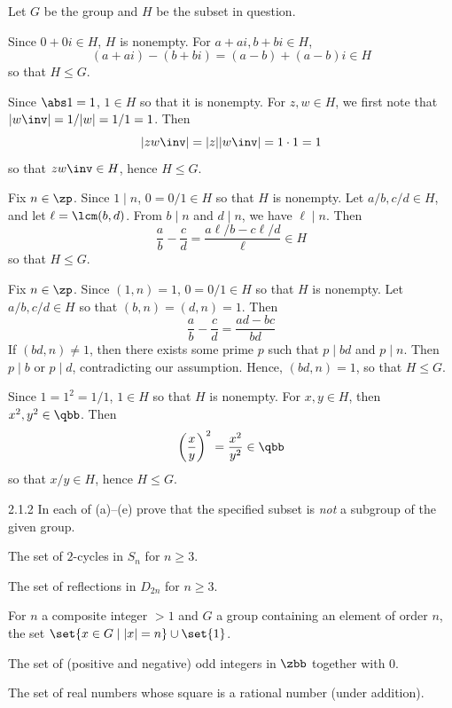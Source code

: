 \begin{sol}
    Let $G$ be the group and $H$ be the subset in question.
    \begin{subexercises}
        \item Since $0 + 0i \in H$, $H$ is nonempty.
        For $a + ai, b + bi \in H$,
        \[
        	(a + ai) - (b + bi) = (a - b) + (a - b)i \in H
        \]
        so that $H \leq G$.
        \item Since $\abs 1 = 1$, $1 \in H$ so that it is nonempty.
        For $z, w \in H$, we first note that $|w\inv| = 1/|w| = 1/1 = 1$.
        Then
        \[
        	|zw\inv| = |z||w\inv| = 1 \cdot 1 = 1
        \]
        so that $zw\inv \in H$, hence $H \leq G$.
        \item Fix $n \in \zp$.
        Since $1 \mid n$, $0 = 0/1 \in H$ so that $H$ is nonempty.
        Let $a/b, c/d \in H$, and let $\ell = \lcm(b, d)$.
        From $b \mid n$ and $d \mid n$, we have $\ell \mid n$.
        Then
        \[
            \frac ab - \frac cd = \frac{a\ell/b - c\ell/d}{\ell} \in H
        \]
        so that $H \leq G$.
        \item Fix $n \in \zp$.
        Since $(1, n) = 1$, $0 = 0/1 \in H$ so that $H$ is nonempty.
        Let $a/b, c/d \in H$ so that $(b, n) = (d, n) = 1$.
        Then
        \[
        	\frac ab - \frac cd = \frac{ad - bc}{bd}
        \]
        If $(bd, n) \neq 1$, then there exists some prime $p$ such that $p \mid bd$ and $p \mid n$.
        Then $p \mid b$ or $p \mid d$, contradicting our assumption.
        Hence, $(bd, n) = 1$, so that $H \leq G$.
        \item Since $1 = 1^2 = 1/1$, $1 \in H$ so that $H$ is nonempty.
        For $x, y \in H$, then $x^2, y^2 \in \qbb$.
        Then
        \[
        	\left(\frac xy\right)^2 = \frac{x^2}{y^2} \in \qbb
        \]
        so that $x/y \in H$, hence $H \leq G$. \qedhere
    \end{subexercises}
\end{sol}

\begin{exercise}{2.1.2}
    In each of (a)--(e) prove that the specified subset is \emph{not} a subgroup of the given group.
    \begin{subexercises}
        \item The set of $2$-cycles in $S_n$ for $n \ge 3$.
        \item The set of reflections in $D_{2n}$ for $n \ge 3$.
        \item For $n$ a composite integer $>1$ and $G$ a group containing an element of order $n$, the set $\set{x \in G \mid |x| = n} \cup \set{1}$.
        \item The set of (positive and negative) odd integers in $\zbb$ together with $0$.
        \item The set of real numbers whose square is a rational number (under addition).
    \end{subexercises}
\end{exercise}

